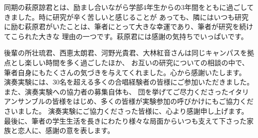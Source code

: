 \documentclass[11pt,a4j,dvipdfmx, twoside]{jreport}
\begin{document}
同期の萩原諒君とは、励まし合いながら学部4年生からの3年間をともに過ごしてきました。時に研究が辛く苦しいと感じることが
あっても、隣にはいつも研究に励む萩原君がいたことは、筆者にとって大きな幸運であり、筆者が研究を続けてこられた大きな
理由の一つです。萩原君には感謝の気持ちでいっぱいです。

後輩の所壮琉君、西恵太朗君、河野光貴君、大林紅音さんは同じキャンパスを拠点とし楽しい時間を多く過ごしたほか、
お互いの研究についての相談の中で、筆者自身にもたくさんの気づきを与えてくれました。心から感謝いたします。
\\

演奏実験には、30名を超える多くの合唱経験者の皆様にご参加いただきました。また、演奏実験への協力者の募集自体も、
団を挙げてご尽力くださったイタリアンサンブルの皆様をはじめ、多くの皆様が実験参加の呼びかけにもご協力くださいました。
演奏実験にご協力くださった皆様に、心より感謝申し上げます。
\\

最後に、筆者の学生生活を長きにわたり様々な局面からいつも支えて下さった家族と恋人に、感謝の意を表します。
\\

\clearpage
\end{document}
